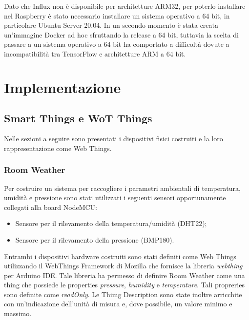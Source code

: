 \documentclass{article}
\begin{document}
Dato che Influx non è disponibile per architetture ARM32, per poterlo installare nel Raspberry è stato necessario installare un sistema operativo a 64 bit, in particolare Ubuntu Server 20.04. In un secondo momento è stata creata un'immagine Docker ad hoc sfruttando la release a 64 bit, tuttavia la scelta di passare a un sistema operativo a 64 bit ha comportato a difficoltà dovute a incompatibilità tra TensorFlow e architetture ARM a 64 bit. 


\section{Implementazione}
\label{section:implementazione}
\subsection{Smart Things e WoT Things}
Nelle sezioni a seguire sono presentati i dispositivi fisici costruiti e la loro rappresentazione come Web Things. 

\subsubsection{Room Weather}
Per costruire un sistema per raccogliere i parametri ambientali di temperatura, umidità e pressione sono stati utilizzati i seguenti sensori opportunamente collegati alla board NodeMCU:
\begin{itemize}
    \item Sensore per il rilevamento della temperatura/umidità (DHT22);
    \item Sensore per il rilevamento della pressione (BMP180).
\end{itemize}

Entrambi i dispositivi hardware costruiti sono stati definiti come Web Things utilizzando il WebThings Framework di Mozilla che fornisce la libreria \textit{webthing} per Arduino IDE. Tale libreria ha permesso di definire Room Weather come una thing che possiede le properties \textit{pressure}, \textit{humidity} e \textit{temperature}. Tali propreries sono definite come \textit{readOnly}.
Le Thimg Description sono state inoltre arricchite con un'indicazione dell'unità di misura e, dove possibile, un valore minimo e massimo.
\end{document}
